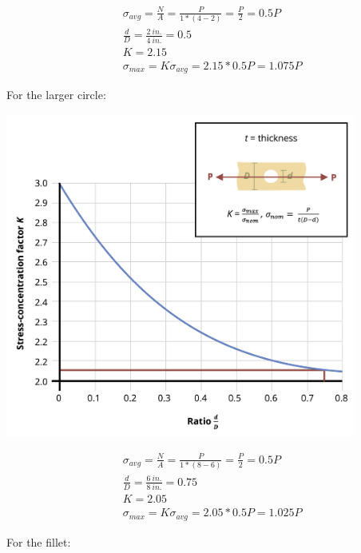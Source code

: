 \documentclass[
  letterpaper,
  DIV=11,
  numbers=noendperiod]{scrreprt}
\begin{document}
\begin{tcolorbox}
\begin{tcolorbox}
\[
\begin{aligned}
& \sigma_{avg}=\frac{N}{A}=\frac{P}{1 *(4-2)}=\frac{P}{2}=0.5 P \\
& \frac{d}{D}=\frac{2{~in.}}{4{~in.}}=0.5 \\
& K=2.15 \\
& \sigma_{max }=K \sigma_{avg}=2.15 * 0.5 P=1.075 P
\end{aligned}
\]

For the larger circle:

\begin{center}
\includegraphics[width=4.54167in,height=\textheight]{images/PNGs/Example 5.2 part 3.png}
\end{center}

\[
\begin{aligned}
& \sigma_{avg}=\frac{N}{A}=\frac{P}{1 *(8-6)}=\frac{P}{2}=0.5 P \\
& \frac{d}{D}=\frac{6{~in.}}{8{~in.}}=0.75 \\
& K=2.05 \\
& \sigma_{max}=K \sigma_{avg}=2.05 * 0.5 P=1.025 P
\end{aligned}
\]

For the fillet:


\end{tcolorbox}
\end{tcolorbox}
\end{document}
